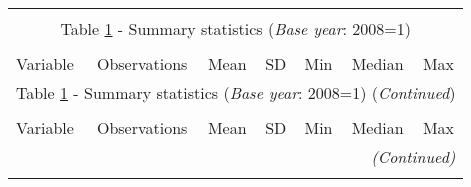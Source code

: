 \begin{longtable}{lcccccc}\\
	\label{tab:number of firms 2008}\\
	\multicolumn{7}{c}{Table \ref{tab:number of firms 2008} - Summary statistics (\textit{Base year}: 2008=1)}\\ \hline \hline\\
	
	Variable   &   Observations &    Mean &          SD&         Min&    Median &    Max\\
	
	\hline \endfirsthead
	
	\multicolumn{7}{c}{Table \ref{tab:number of firms 2008} - Summary statistics (\textit{Base year}: 2008=1) (\textit{Continued})}\\ \hline \hline\\
	
	Variable   &   Observations &    Mean &          SD&         Min&     Median  &  Max\\
	
	\hline \endhead
	\hline
	\multicolumn{7}{r}{{\textit{(Continued)}}}\\ \endfoot
	
	\endlastfoot
	

\end{longtable}
